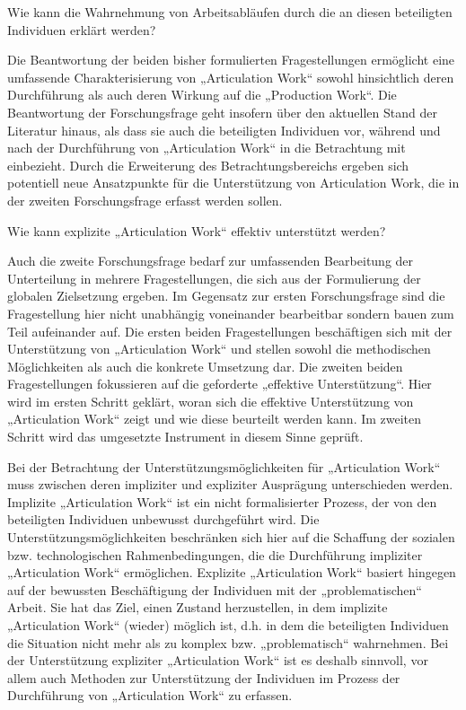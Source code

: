 \begin{tf}
	\label{tf:rolle_der_individuen}
	Wie kann die Wahrnehmung von Arbeitsabläufen durch die an diesen beteiligten Individuen erklärt werden?
\end{tf}

Die Beantwortung der beiden bisher formulierten Fragestellungen ermöglicht eine umfassende Charakterisierung von „Articulation Work“ sowohl hinsichtlich deren Durchführung als auch deren Wirkung auf die „Production Work“. Die Beantwortung der Forschungsfrage geht insofern über den aktuellen Stand der Literatur hinaus, als dass sie auch die beteiligten Individuen vor, während und nach der Durchführung von „Articulation Work“ in die Betrachtung mit einbezieht. Durch die Erweiterung des Betrachtungsbereichs ergeben sich potentiell neue Ansatzpunkte für die Unterstützung von Articulation Work, die in der zweiten Forschungsfrage erfasst werden sollen.

\begin{ff}
	\label{ff:umsetzung}
	Wie kann explizite „Articulation Work“ effektiv unterstützt werden?
\end{ff}

Auch die zweite Forschungsfrage bedarf zur umfassenden Bearbeitung der Unterteilung in mehrere Fragestellungen, die sich aus der Formulierung der globalen Zielsetzung ergeben. Im Gegensatz zur ersten Forschungsfrage sind die Fragestellung hier nicht unabhängig voneinander bearbeitbar sondern bauen zum Teil aufeinander auf. Die ersten beiden Fragestellungen beschäftigen sich mit der Unterstützung von „Articulation Work“ und stellen sowohl die methodischen Möglichkeiten als auch die konkrete Umsetzung dar. Die zweiten beiden Fragestellungen fokussieren auf die geforderte „effektive Unterstützung“. Hier wird im ersten Schritt geklärt, woran sich die effektive Unterstützung von „Articulation Work“ zeigt und wie diese beurteilt werden kann. Im zweiten Schritt wird das umgesetzte Instrument in diesem Sinne geprüft. 

Bei der Betrachtung der Unterstützungsmöglichkeiten für „Articulation Work“ muss zwischen deren impliziter und expliziter Ausprägung unterschieden werden. Implizite „Articulation Work“ ist ein nicht formalisierter Prozess, der von den beteiligten Individuen unbewusst durchgeführt wird. Die Unterstützungsmöglichkeiten beschränken sich hier auf die Schaffung der sozialen bzw. technologischen Rahmenbedingungen, die die Durchführung impliziter „Articulation Work“ ermöglichen. Explizite „Articulation Work“ basiert hingegen auf der bewussten Beschäftigung der Individuen mit der „problematischen“ Arbeit. Sie hat das Ziel, einen Zustand herzustellen, in dem implizite „Articulation Work“ (wieder) möglich ist, d.h. in dem die beteiligten Individuen die Situation nicht mehr als zu komplex bzw. „problematisch“ wahrnehmen. Bei der Unterstützung expliziter „Articulation Work“ ist es deshalb sinnvoll, vor allem auch Methoden zur Unterstützung der Individuen im Prozess der Durchführung von „Articulation Work“ zu erfassen.

